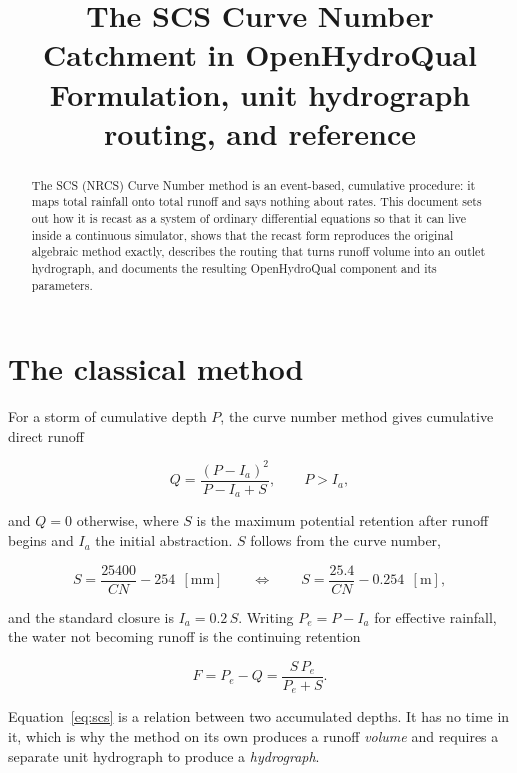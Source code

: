 \documentclass[11pt,a4paper]{article}
\title{\textbf{The SCS Curve Number Catchment in OpenHydroQual}\\[0.3em]
       \large Formulation, unit hydrograph routing, and reference}
\author{}
\date{}
\begin{document}
\maketitle
\vspace{-2.5em}

\begin{abstract}
\noindent
The SCS (NRCS) Curve Number method is an event-based, cumulative procedure: it
maps total rainfall onto total runoff and says nothing about rates. This
document sets out how it is recast as a system of ordinary differential
equations so that it can live inside a continuous simulator, shows that the
recast form reproduces the original algebraic method exactly, describes the
routing that turns runoff volume into an outlet hydrograph, and documents the
resulting OpenHydroQual component and its parameters.
\end{abstract}

\tableofcontents

\section{The classical method}

For a storm of cumulative depth $P$, the curve number method gives cumulative
direct runoff

\begin{equation}
Q=\frac{(P-I_a)^{2}}{P-I_a+S},\qquad P>I_a,
\label{eq:scs}
\end{equation}

\noindent
and $Q=0$ otherwise, where $S$ is the maximum potential retention after runoff
begins and $I_a$ the initial abstraction. $S$ follows from the curve number,

\begin{equation}
S=\frac{25400}{CN}-254 \ \ [\mathrm{mm}] \qquad\Longleftrightarrow\qquad
S=\frac{25.4}{CN}-0.254 \ \ [\mathrm{m}],
\label{eq:S}
\end{equation}

\noindent
and the standard closure is $I_a=0.2\,S$. Writing $P_e=P-I_a$ for effective
rainfall, the water not becoming runoff is the continuing retention

\begin{equation}
F=P_e-Q=\frac{S\,P_e}{P_e+S}.
\label{eq:F}
\end{equation}

Equation~\eqref{eq:scs} is a relation between two accumulated depths. It has no
time in it, which is why the method on its own produces a runoff \emph{volume}
and requires a separate unit hydrograph to produce a \emph{hydrograph}.
\end{document}
